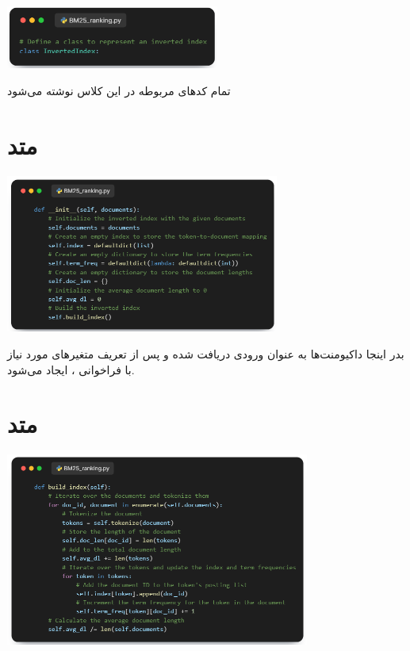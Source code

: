 \documentclass[12pt, dvipsnames, svgnames, x11names,]{article}
\begin{document}
		\begin{center}
			{\includegraphics[width=7cm]{images/02.png}}
		\end{center}
	
		{\normalsize تمام کدهای مربوطه در این کلاس نوشته می‌شود}
	
				
	
	\section{متد }
		\begin{center}
			{\includegraphics[width=9cm]{images/03.png}} \par
		\end{center}
		
		{\normalsize  بدر اینجا داکیومنت‌ها به عنوان ورودی دریافت شده و پس از تعریف متغیرهای مورد نیاز با فراخوانی ،  ایجاد می‌شود.}
	
	
	\section{متد }
	
		\begin{center}
			{\includegraphics[width=10cm]{images/04.png}} \par
		\end{center}
		
\end{document}
